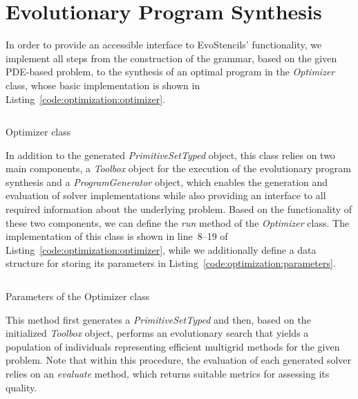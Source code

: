 \section{Evolutionary Program Synthesis}
\label{sec:evostencils-part1:evolutionary-program-synthesis}
In order to provide an accessible interface to EvoStencils' functionality, we implement all steps from the construction of the grammar, based on the given PDE-based problem, to the synthesis of an optimal program in the \emph{Optimizer} class, whose basic implementation is shown in Listing~\ref{code:optimization:optimizer}.
\begin{listing}
    \inputminted[linenos]{python}{evostencils/optimization/optimizer.py}
	\caption{Optimizer class}
	\label{code:optimization:optimizer}
\end{listing}
In addition to the generated \emph{PrimitiveSetTyped} object, this class relies on two main components, a \emph{Toolbox} object for the execution of the evolutionary program synthesis and a \emph{ProgramGenerator} object, which enables the generation and evaluation of solver implementations while also providing an interface to all required information about the underlying problem.
Based on the functionality of these two components, we can define the \emph{run} method of the \emph{Optimizer} class.
The implementation of this class is shown in line~8--19 of Listing~\ref{code:optimization:optimizer}, while we additionally define a data structure for storing its parameters in Listing~\ref{code:optimization:parameters}.
\begin{listing}
    \inputminted{python}{evostencils/optimization/parameters.py}
	\caption{Parameters of the Optimizer class}
	\label{code:optimization:parameters}
\end{listing}
This method first generates a \emph{PrimitiveSetTyped} and then, based on the initialized \emph{Toolbox} object, performs an evolutionary search that yields a population of individuals representing efficient multigrid methods for the given problem.
Note that within this procedure, the evaluation of each generated solver relies on an \emph{evaluate} method, which returns suitable metrics for assessing its quality.

